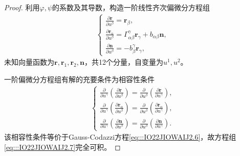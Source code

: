 \documentclass[../../main.tex]{subfiles}%
\begin{document}
\begin{proof}
利用$\varphi,\psi$的系数及其导数，构造一阶线性齐次偏微分方程组
\begin{align}
\begin{cases}
\displaystyle\frac{\partial \boldsymbol{r}}{\partial u^\beta} = \boldsymbol{r}_\beta,\\[6pt]
\displaystyle\frac{\partial \boldsymbol{r}_\alpha}{\partial u^\beta} = \Gamma^\gamma_{\alpha\beta}\boldsymbol{r}_\gamma + b_{\alpha\beta}\boldsymbol{n},\\[6pt]
\displaystyle\frac{\partial \boldsymbol{n}}{\partial u^\beta} = -b^\gamma_\beta \boldsymbol{r}_\gamma,
\end{cases}
\label{eq:::IO22JIOWAIJ2.7}
\end{align}
未知向量函数为$\boldsymbol{r},\boldsymbol{r}_1,\boldsymbol{r}_2,\boldsymbol{n}$，共12个分量，自变量为$u^1,u^2$。

一阶偏微分方程组有解的充要条件为相容性条件
\begin{align*}
\begin{cases}
\displaystyle\frac{\partial}{\partial u^\gamma}\left(\frac{\partial \boldsymbol{r}}{\partial u^\beta}\right) = \frac{\partial}{\partial u^\beta}\left(\frac{\partial \boldsymbol{r}}{\partial u^\gamma}\right),\\[6pt]
\displaystyle\frac{\partial}{\partial u^\gamma}\left(\frac{\partial \boldsymbol{r}_\alpha}{\partial u^\beta}\right) = \frac{\partial}{\partial u^\beta}\left(\frac{\partial \boldsymbol{r}_\alpha}{\partial u^\gamma}\right),\\[6pt]
\displaystyle\frac{\partial}{\partial u^\gamma}\left(\frac{\partial \boldsymbol{n}}{\partial u^\beta}\right) = \frac{\partial}{\partial u^\beta}\left(\frac{\partial \boldsymbol{n}}{\partial u^\gamma}\right).
\end{cases}
\end{align*}
该相容性条件等价于Gauss-Codazzi方程\eqref{eq:::IO22JIOWAIJ2.6}，故方程组\eqref{eq:::IO22JIOWAIJ2.7}完全可积。


\end{proof}
\end{document}
